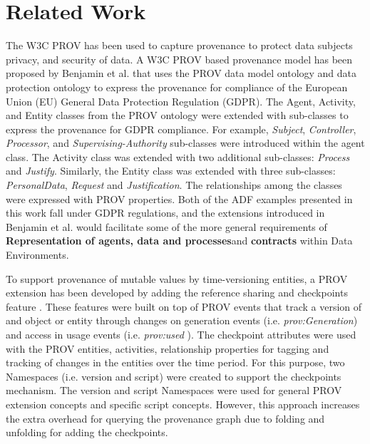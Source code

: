 \section{Related Work} \label{sec:relwork}

The W3C PROV has been used to capture provenance to protect data subjects privacy, and security of data. A W3C PROV based provenance model has been proposed by Benjamin et al. \cite{ujcich2018provenance} that uses the PROV data model ontology and data protection ontology to express the provenance for compliance of the European Union (EU) General Data Protection Regulation (GDPR). The Agent, Activity, and Entity classes from the PROV ontology were extended with sub-classes to express the provenance for GDPR compliance. For example, \textit{Subject}, \textit{Controller}, \textit{Processor}, and \textit{Supervising-Authority} sub-classes were introduced within the agent class. The Activity class was extended with  two additional sub-classes: \textit{Process} and \textit{Justify}. Similarly, the Entity class was extended with three sub-classes:  \textit{PersonalData}, \textit{Request} and \textit{Justification}. The relationships among the classes were expressed with PROV properties. Both of the ADF examples presented in this work fall under GDPR regulations, and the extensions introduced in Benjamin et al. \cite{ujcich2018provenance} would facilitate some of the more general requirements of \textbf{Representation of agents, data and processes}and \textbf{contracts} within Data Environments.

To support  provenance of mutable values by time-versioning entities,  a PROV extension has been developed by adding the reference sharing and checkpoints feature \cite{pimentel2018versioned}. These features were built on top of  PROV events that track a version of and object or entity through changes on generation events (i.e. \textit{prov:Generation}) and access in  usage events (i.e. \textit{prov:used  }). The checkpoint attributes were used with the PROV entities, activities, relationship properties for tagging and tracking of changes in the entities over the time period. For this purpose, two Namespaces (i.e. version and script) were created to support the checkpoints mechanism. The version and script Namespaces were used for general PROV extension concepts and specific script concepts. However, this approach increases the extra overhead for querying the provenance graph due to folding and unfolding for adding the checkpoints.  

